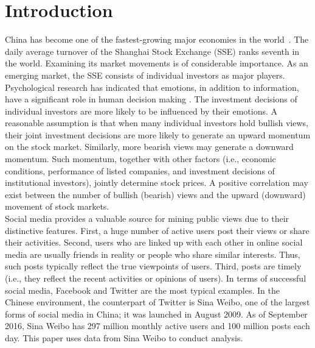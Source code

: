 \documentclass[review,3p,times,12pt,number]{elsarticle}
\begin{document}
\section{Introduction}
China has become one of the fastest-growing major economies in the world~\cite{Bruche2009A}. The daily average turnover of the Shanghai Stock Exchange (SSE) ranks seventh in the world. Examining its market movements is of considerable importance. As an emerging market, the SSE consists of individual investors as major players. Psychological research has indicated that emotions, in addition to information, have a significant role in human decision making \cite{Dolan2002}. The investment decisions of individual investors are more likely to be influenced by their emotions. A reasonable assumption is that when many individual investors hold bullish views, their joint investment decisions are more likely to generate an upward momentum on the stock market. Similarly, more bearish views may generate a downward momentum. Such momentum, together with other factors (i.e., economic conditions, performance of listed companies, and investment decisions of institutional investors), jointly determine stock prices. A positive correlation may exist between the number of bullish (bearish) views and the upward (downward) movement of stock markets.\\
\indent
Social media provides a valuable source for mining public views due to their distinctive features. First, a huge number of active users post their views or share their activities. Second, users who are linked up with each other in online social media are usually friends in reality or people who share similar interests. Thus, such posts typically reflect the true viewpoints of users. Third, posts are timely (i.e., they reflect the recent activities or opinions of users). In terms of successful social media, Facebook and Twitter are the most typical examples. In the Chinese environment, the counterpart of Twitter is Sina Weibo, one of the largest forms of social media in China; it was launched in August 2009. As of September 2016, Sina Weibo has 297 million monthly active users and 100 million posts each day. This paper uses data from Sina Weibo to conduct analysis.\\
\indent
\end{document}
